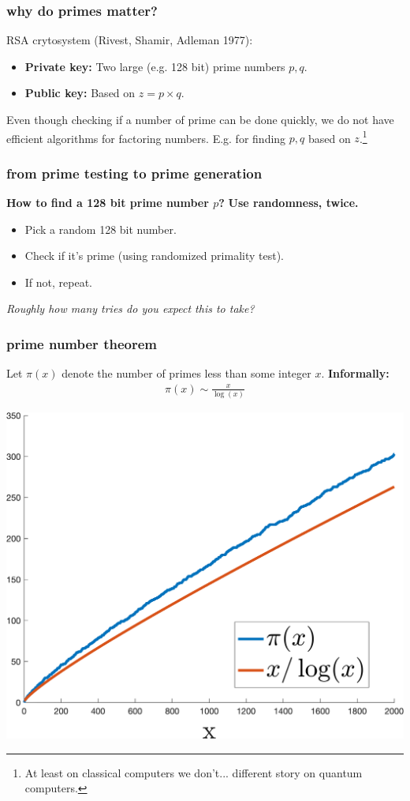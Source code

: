 \documentclass[compress]{beamer}
\begin{document}
\begin{frame}
	\frametitle{why do primes matter?}	
	RSA crytosystem (Rivest, Shamir, Adleman 1977): 
	\begin{itemize}
		\item \textbf{Private key:} Two large (e.g. 128 bit) prime numbers $p,q$.
		\item \textbf{Public key:} Based on $z = p\times q$.  
	\end{itemize} 
	
	Even though checking if a number of prime can be done quickly, we do not have efficient algorithms for factoring numbers. E.g. for finding $p,q$ based on $z$.\footnote{At least on classical computers we don't... different story on quantum computers.}
\end{frame}


\begin{frame}
	\frametitle{from prime testing to prime generation}
	\textbf{How to find a 128 bit prime number $p$?} \alert{\textbf{Use randomness, twice.}}
	\begin{itemize}
		\item Pick a random 128 bit number. 
		\item Check if it's prime (using randomized primality test).
		\item If not, repeat.
	\end{itemize}
	\begin{center}
		\emph{Roughly how many tries do you expect this to take?}
	\end{center}
\end{frame}

\begin{frame}
	\frametitle{prime number theorem}
 Let $\pi(x)$ denote the number of primes less than some integer $x$. 	\textbf{Informally:}
	\vspace{-.5em}
	\begin{align*}
		\pi(x) \sim \frac{x}{\log(x)}
	\end{align*}
	\vspace{-1em}
	
	\begin{center}
		\includegraphics[width=.6\textwidth]{prime_number_theorem.png}
	\end{center}
\end{frame}
\end{document}

